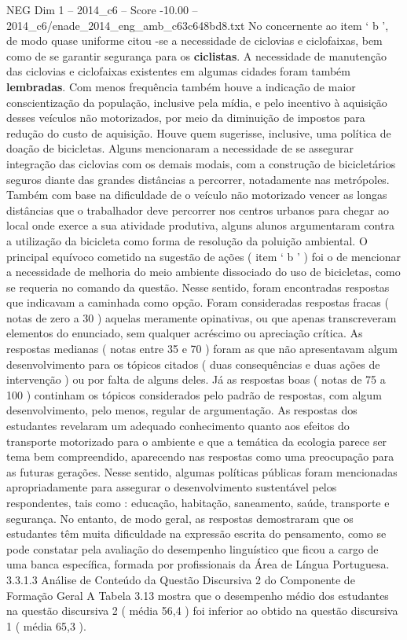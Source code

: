 \begin{textsample}{NEG Dim 1 – 2014\_c6 – Score -10.00 – 2014\_c6/enade\_2014\_eng\_amb\_c63c648bd8.txt}
No concernente ao item ‘ b ’, de modo quase uniforme citou -se a necessidade de ciclovias e ciclofaixas, bem como de se garantir segurança para os \textbf{ciclistas}.
A necessidade de manutenção das ciclovias e ciclofaixas existentes em algumas cidades foram também \textbf{lembradas}.
Com menos frequência também houve a indicação de maior conscientização da população, inclusive pela mídia, e pelo incentivo à aquisição desses veículos não motorizados, por meio da diminuição de impostos para redução do custo de aquisição.
Houve quem sugerisse, inclusive, uma política de doação de bicicletas.
Alguns mencionaram a necessidade de se assegurar integração das ciclovias com os demais modais, com a construção de bicicletários seguros diante das grandes distâncias a percorrer, notadamente nas metrópoles.
Também com base na dificuldade de o veículo não motorizado vencer as longas distâncias que o trabalhador deve percorrer nos centros urbanos para chegar ao local onde exerce a sua atividade produtiva, alguns alunos argumentaram contra a utilização da bicicleta como forma de resolução da poluição ambiental.
O principal equívoco cometido na sugestão de ações ( item ‘ b ’ ) foi o de mencionar a necessidade de melhoria do meio ambiente dissociado do uso de bicicletas, como se requeria no comando da questão.
Nesse sentido, foram encontradas respostas que indicavam a caminhada como opção.
Foram consideradas respostas fracas ( notas de zero a 30 ) aquelas meramente opinativas, ou que apenas transcreveram elementos do enunciado, sem qualquer acréscimo ou apreciação crítica.
As respostas medianas ( notas entre 35 e 70 ) foram as que não apresentavam algum desenvolvimento para os tópicos citados ( duas consequências e duas ações de intervenção ) ou por falta de alguns deles.
Já as respostas boas ( notas de 75 a 100 ) continham os tópicos considerados pelo padrão de respostas, com algum desenvolvimento, pelo menos, regular de argumentação.
As respostas dos estudantes revelaram um adequado conhecimento quanto aos efeitos do transporte motorizado para o ambiente e que a temática da ecologia parece ser tema bem compreendido, aparecendo nas respostas como uma preocupação para as futuras gerações.
Nesse sentido, algumas políticas públicas foram mencionadas apropriadamente para assegurar o desenvolvimento sustentável pelos respondentes, tais como : educação, habitação, saneamento, saúde, transporte e segurança.
No entanto, de modo geral, as respostas demostraram que os estudantes têm muita dificuldade na expressão escrita do pensamento, como se pode constatar pela avaliação do desempenho linguístico que ficou a cargo de uma banca específica, formada por profissionais da Área de Língua Portuguesa. 3.3.1.3 Análise de Conteúdo da Questão Discursiva 2 do Componente de Formação Geral A Tabela 3.13 mostra que o desempenho médio dos estudantes na questão discursiva 2 ( média 56,4 ) foi inferior ao obtido na questão discursiva 1 ( média 65,3 ).

\end{textsample}
